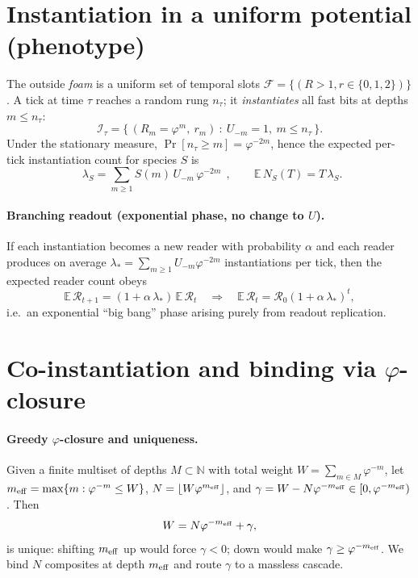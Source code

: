 \documentclass[11pt]{article}
\theoremstyle{remark}
\newcommand{\bb}[1]{\boxed{\;#1\;}}
\begin{document}
\section{Instantiation in a uniform potential (phenotype)}\label{sec:inst}
The outside \emph{foam} is a uniform set of temporal slots $\mathcal F=\{(R>1,r\in\{0,1,2\})\}$.
A tick at time $\tau$ reaches a random rung $n_\tau$; it \emph{instantiates} all fast bits at depths $m\le n_\tau$:
\begin{equation}
\mathcal I_\tau=\{\, (R_m=\varphi^m,\ r_m) \ :\ U_{-m}=1,\ m\le n_\tau\,\}.
\end{equation}
Under the stationary measure, $\Pr[n_\tau\ge m]=\varphi^{-2m}$, hence the expected per-tick instantiation count for species $S$ is
\begin{equation}\label{lambdaS}
\bb{\,\lambda_S=\sum_{m\ge1} S(m)\,U_{-m}\,\varphi^{-2m}\,},\qquad \mathbb E\,N_S(T)=T\,\lambda_S.
\end{equation}
\paragraph{Branching readout (exponential phase, no change to $U$).}
If each instantiation becomes a new reader with probability $\alpha$ and each reader produces on average $\lambda_\ast=\sum_{m\ge1}U_{-m}\varphi^{-2m}$ instantiations per tick, then the expected reader count obeys
\begin{equation}\label{branching}
\mathbb E\,\mathcal R_{t+1}=(1+\alpha\,\lambda_\ast)\,\mathbb E\,\mathcal R_t\quad\Rightarrow\quad
\mathbb E\,\mathcal R_t=\mathcal R_0(1+\alpha\,\lambda_\ast)^t,
\end{equation}
i.e.\ an exponential ``big bang'' phase arising purely from readout replication.

\section{Co-instantiation and binding via \texorpdfstring{$\varphi$}{phi}-closure}

\paragraph{Greedy $\varphi$-closure and uniqueness.}
Given a finite multiset of depths $M\subset\mathbb N$ with total weight $W=\sum_{m\in M}\varphi^{-m}$, let $m_{\rm eff}=\max\{m:\varphi^{-m}\le W\}$, $N=\lfloor W\varphi^{m_{\rm eff}}\rfloor$, and $\gamma=W-N\varphi^{-m_{\rm eff}}\in[0,\varphi^{-m_{\rm eff}})$.
Then
\[
W=N\varphi^{-m_{\rm eff}}+\gamma,
\]
is unique: shifting $m_{\rm eff}$ up would force $\gamma<0$; down would make $\gamma\ge \varphi^{-m_{\rm eff}}$.
We bind $N$ composites at depth $m_{\rm eff}$ and route $\gamma$ to a massless cascade.
\end{document}
